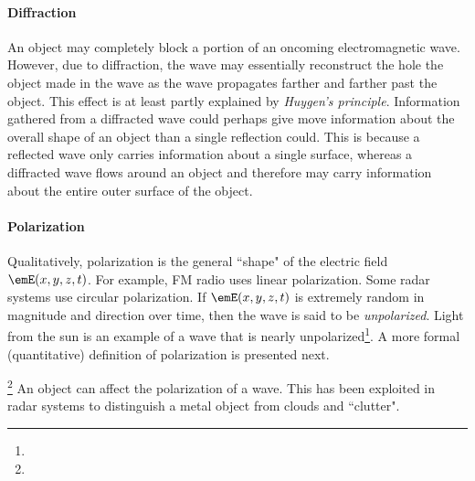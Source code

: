 \paragraph{Diffraction}
An object may completely block a portion of an oncoming electromagnetic wave.
However, due to diffraction, the wave may essentially reconstruct the
hole the object made in the wave as the wave propagates farther and farther past
the object.  This effect is at least partly explained by {\em Huygen's principle}.
Information gathered from a diffracted wave could perhaps give move
information about the overall shape of an object than a single reflection could.
This is because a reflected wave only carries information about a single surface,
whereas a diffracted wave flows around an object and therefore may carry information
about the entire outer surface of the object.

\paragraph{Polarization}
Qualitatively, polarization is the general ``shape" of the electric field $\emE(x,y,z,t)$.
For example, FM radio uses linear polarization.
Some radar systems use circular polarization.
If $\emE(x,y,z,t)$ is extremely random in magnitude and direction over time,
then the wave is said to be {\em unpolarized}.
Light from the sun is an example of a wave that is nearly unpolarized\footnote{}.
A more formal (quantitative) definition of polarization is presented next.

\begin{definition}
\label{def:polarization}
\end{definition}

\begin{remark}
\footnote{
  }
An object can affect the polarization of a wave.
This has been exploited in radar systems to distinguish a metal object from
clouds and ``clutter".
\end{remark}

